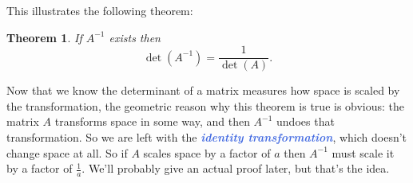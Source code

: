 \documentclass[10pt]{article}
\newcommand{\demph}[1]{\textcolor{RoyalBlue}{\textbf{\slshape #1}}} %
\newenvironment{augmentedmatrix}[1] %
{\left[\begin{array}{#1}}
    {\end{array}\right]}
\newtheorem{theorem}{Theorem}
\theoremstyle{definition}
\newtheorem{example}[theorem]{Example}
\renewenvironment{example}
{\begin{oldexample}}
  {\par\smallskip\hfill   End of Example~\theexample. $\square$    \par\end{oldexample}}
\begin{document}
This illustrates the following theorem:
\begin{theorem}
  If $A^{-1}$ exists then
  \begin{equation*}
    \det(A^{-1}) = \frac{1}{\det(A)}.
  \end{equation*}
\end{theorem}
Now that we know the determinant of a matrix measures how space is scaled by
the transformation, the geometric reason why this theorem is true is obvious:
the matrix $A$ transforms space in some way, and then $A^{-1}$ undoes that
transformation. So we are left with the \demph{identity transformation}, which
doesn't change space at all. So if $A$ scales space by a factor of $a$ then
$A^{-1}$ must scale it by a factor of $\frac{1}{a}$. We'll probably give an
actual proof later, but that's the idea.


\end{document}

